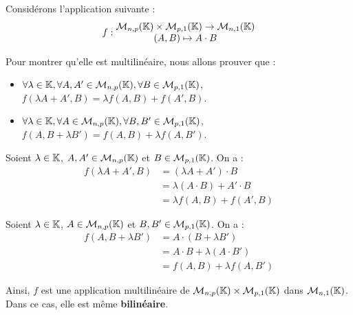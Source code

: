 \documentclass[12pt, a4paper]{report}
\begin{document}
\begin{example}
    Considérons l'application suivante :
    $$f : \begin{matrix} \mathcal M_{n,p}(\mathbb{K}) \times \mathcal M_{p,1}(\mathbb{K}) \to \mathcal M_{n,1}(\mathbb{K}) \\ (A,B) \mapsto A \cdot B \end{matrix}$$

    Pour montrer qu'elle est multilinéaire, nous allons prouver que :
    \begin{itemize}
        \item $\forall \lambda \in \mathbb{K}, \forall A, A' \in \mathcal M_{n,p}(\mathbb{K}), \forall B \in \mathcal M_{p,1}(\mathbb{K})$, $f(\lambda A + A', B) = \lambda f(A,B) + f(A',B)$.
        \item $\forall \lambda \in \mathbb{K}, \forall A \in \mathcal M_{n,p}(\mathbb{K}), \forall B, B' \in \mathcal M_{p,1}(\mathbb{K})$, $f(A, B + \lambda B') = f(A,B) + \lambda f(A,B')$.
    \end{itemize}

    Soient $\lambda \in \mathbb{K}$, $A, A' \in \mathcal M_{n,p}(\mathbb{K})$ et $B \in \mathcal M_{p,1}(\mathbb{K})$. On a :
    \begin{align*}
        f(\lambda A + A', B) &= (\lambda A + A') \cdot B \\
        &= \lambda (A \cdot B) + A' \cdot B \\
        &= \lambda f(A,B) + f(A',B)
    \end{align*}

    Soient $\lambda \in \mathbb{K}$, $A \in \mathcal M_{n,p}(\mathbb{K})$ et $B, B' \in \mathcal M_{p,1}(\mathbb{K})$. On a :
    \begin{align*}
        f(A, B + \lambda B') &= A \cdot (B + \lambda B') \\
        &= A \cdot B + \lambda (A \cdot B') \\
        &= f(A,B) + \lambda f(A,B')
    \end{align*}

    Ainsi, $f$ est une application multilinéaire de $\mathcal M_{n,p}(\mathbb{K}) \times \mathcal M_{p,1}(\mathbb{K})$ dans $\mathcal M_{n,1}(\mathbb{K})$. Dans ce cas, elle est même \textbf{bilinéaire}.
\end{example}
\end{document}
